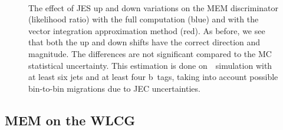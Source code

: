 \begin{figure}[ht]
\begin{centering}
\\
\caption[The full variation in the MEM discriminator]{The effect of JES up and down variations on the MEM discriminator (likelihood ratio) with the full computation (blue) and with the vector integration approximation method (red). As before, we see that both the up and down shifts have the correct direction and magnitude. The differences are not significant compared to the MC statistical uncertainty. This estimation is done on~\ttHbb~simulation with at least six jets and at least four b~tags, taking into account possible bin-to-bin migrations due to JEC uncertainties.}
\label{fig:jes_variation_ratio}
\end{centering}
\end{figure}

\subsection{MEM on the WLCG}

